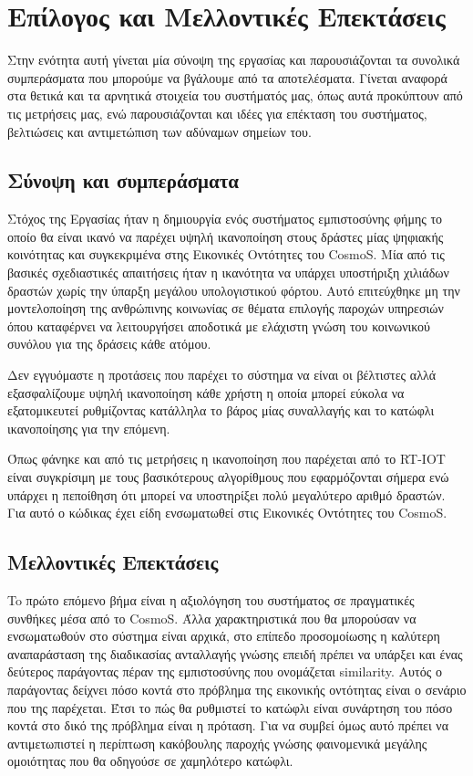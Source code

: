 \chapter{ Επίλογος και Μελλοντικές Επεκτάσεις}\label{ch:conclusion}


Στην ενότητα αυτή γίνεται μία σύνοψη της εργασίας και παρουσιάζονται τα
συνολικά συμπεράσματα που μπορούμε να βγάλουμε από τα αποτελέσματα.
Γίνεται αναφορά στα θετικά και τα αρνητικά στοιχεία του συστήματός μας,
όπως αυτά προκύπτουν από τις μετρήσεις μας, ενώ παρουσιάζονται και ιδέες
για επέκταση του συστήματος, βελτιώσεις και αντιμετώπιση των αδύναμων
σημείων του.


\section{Σύνοψη και συμπεράσματα}

Στόχος της Εργασίας ήταν η δημιουργία ενός συστήματος εμπιστοσύνης φήμης το οποίο θα είναι ικανό να παρέχει υψηλή ικανοποίηση στους δράστες μίας ψηφιακής κοινότητας και συγκεκριμένα στης Εικονικές Οντότητες του CosmoS. Μία από τις βασικές σχεδιαστικές απαιτήσεις ήταν η ικανότητα να υπάρχει υποστήριξη χιλιάδων δραστών χωρίς την ύπαρξη μεγάλου υπολογιστικού φόρτου. Αυτό επιτεύχθηκε μη την μοντελοποίηση της ανθρώπινης κοινωνίας σε θέματα επιλογής παροχών υπηρεσιών όπου καταφέρνει να λειτουργήσει αποδοτικά με ελάχιστη γνώση του κοινωνικού συνόλου για της δράσεις κάθε ατόμου. 

Δεν εγγυόμαστε η προτάσεις που παρέχει το σύστημα να είναι οι βέλτιστες αλλά εξασφαλίζουμε υψηλή ικανοποίηση κάθε χρήστη η οποία μπορεί εύκολα να εξατομικευτεί ρυθμίζοντας κατάλληλα το βάρος μίας συναλλαγής και το κατώφλι ικανοποίησης για την επόμενη.

Όπως φάνηκε και από τις μετρήσεις η ικανοποίηση που παρέχεται από το RT-IOT είναι συγκρίσιμη με τους βασικότερους αλγορίθμους που εφαρμόζονται σήμερα ενώ υπάρχει η πεποίθηση ότι μπορεί να υποστηρίξει πολύ μεγαλύτερο αριθμό δραστών. Για αυτό ο κώδικας έχει είδη ενσωματωθεί στις Εικονικές Οντότητες του CosmoS.

\section{Μελλοντικές Επεκτάσεις}

To πρώτο επόμενο βήμα είναι η αξιολόγηση του συστήματος σε πραγματικές συνθήκες μέσα από το CosmoS. Άλλα χαρακτηριστικά που θα μπορούσαν να ενσωματωθούν στο σύστημα είναι αρχικά, στο επίπεδο προσομοίωσης η καλύτερη αναπαράσταση της διαδικασίας ανταλλαγής γνώσης επειδή πρέπει να υπάρξει και ένας δεύτερος παράγοντας πέραν της εμπιστοσύνης που ονομάζεται similarity. Αυτός ο παράγοντας δείχνει πόσο κοντά στο πρόβλημα της εικονικής οντότητας είναι ο σενάριο που της παρέχεται. Έτσι το πώς θα ρυθμιστεί το κατώφλι είναι συνάρτηση του πόσο κοντά στο δικό της πρόβλημα είναι η πρόταση. Για να συμβεί όμως αυτό πρέπει να αντιμετωπιστεί η περίπτωση κακόβουλης παροχής γνώσης φαινομενικά μεγάλης ομοιότητας που θα οδηγούσε σε χαμηλότερο κατώφλι.

